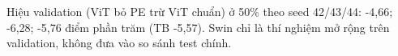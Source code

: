 Hiệu validation (ViT bỏ PE trừ ViT chuẩn) ở 50\% theo seed 42/43/44: -4,66; -6,28; -5,76 điểm phần trăm (TB -5,57). Swin chỉ là thí nghiệm mở rộng trên validation, không đưa vào so sánh test chính.
